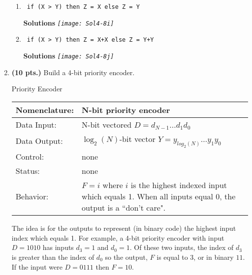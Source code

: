 \begin{enumerate}
\begin{enumerate}
                \item \verb^ if (X > Y) then Z = X else Z = Y ^

                    \begin{onlysolution} \textbf{Solutions} \itshape{
                            \texttt{[image: Sol4-8i]}
                        }
                    \end{onlysolution}

                \item \verb^ if (X > Y) then Z = X+X else Z = Y+Y ^

                    \begin{onlysolution} \textbf{Solutions} \itshape{
                            \texttt{[image: Sol4-8j]}
                        }
                    \end{onlysolution}

            \end{enumerate}

        \item \textbf{ (10 pts.)} Build a 4-bit priority encoder.

            \begin{buildingblock}{Priority Encoder}
                \begin{tabular}{|l|p{3.5in}|} \hline
                    Nomenclature:  & N-bit priority encoder                \\ \hline
                    Data Input:    & N-bit vectored  $D=d_{N-1} \ldots d_1 d_0$  \\ \hline
                    Data Output:   & $\log_2(N)$-bit vector $Y=y_{log_2(N)} \ldots y_1 y_0$    \\ \hline
                    Control:       & none                    \\ \hline
                    Status:        & none                                   \\ \hline
                    Behavior:      & $F = i$ where $i$ is the highest indexed input
                    which equals 1.  When all inputs equal
                    0, the output is a ``don't care".  \\ \hline
                \end{tabular}
                \label{page:prior}
            \end{buildingblock}

            The idea is for the outputs to represent (in binary code) the highest
            input index which equals 1.  For example, a 4-bit priority encoder
            with input $D=1010$ has inputs $d_3=1$ and $d_0=1$.  Of these two
            inputs, the index of $d_3$ is greater than the index of $d_0$ so the
            output, $F$ is equal to 3, or in binary $11$.  If the input were
            $D=0111$ then $F=10$.


\end{enumerate}
